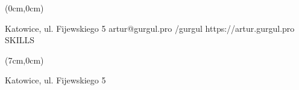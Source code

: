 \documentclass[10pt]{article}
\begin{document}
\begin{textblock*}{7cm}(0cm,0cm)

            \begin{minipage}[t][34cm][t]{5cm}
            \vspace{1cm}
            \noindent Katowice, ul. Fijewskiego 5 \linebreak
            artur@gurgul.pro\linebreak
            /gurgul\linebreak
            https://artur.gurgul.pro
            \vspace{1cm}
            SKILLS
            \end{minipage}

\end{textblock*}

\begin{textblock*}{13cm}(7cm,0cm)

            \begin{minipage}[t][34cm][t]{4cm}
            \vspace{1cm}
            \noindent Katowice, ul. Fijewskiego 5
            \end{minipage}

\end{textblock*}
\end{document}
